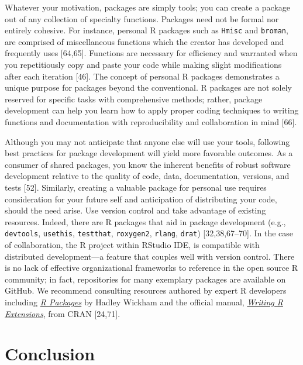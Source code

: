 \documentclass[10pt,letterpaper]{article}
\begin{document}
Whatever your motivation, packages are simply tools; you can create a
package out of any collection of specialty functions. Packages need not
be formal nor entirely cohesive. For instance, personal R packages such
as \texttt{Hmisc} and \texttt{broman}, are comprised of miscellaneous
functions which the creator has developed and frequently uses
{[}64,65{]}. Functions are necessary for efficiency and warranted when
you repetitiously copy and paste your code while making slight
modifications after each iteration {[}46{]}. The concept of personal R
packages demonstrates a unique purpose for packages beyond the
conventional. R packages are not solely reserved for specific tasks with
comprehensive methods; rather, package development can help you learn
how to apply proper coding techniques to writing functions and
documentation with reproducibility and collaboration in mind {[}66{]}.

Although you may not anticipate that anyone else will use your tools,
following best practices for package development will yield more
favorable outcomes. As a consumer of shared packages, you know the
inherent benefits of robust software development relative to the quality
of code, data, documentation, versions, and tests {[}52{]}. Similarly,
creating a valuable package for personal use requires consideration for
your future self and anticipation of distributing your code, should the
need arise. Use version control and take advantage of existing
resources. Indeed, there are R packages that aid in package development
(e.g., \texttt{devtools}, \texttt{usethis}, \texttt{testthat},
\texttt{roxygen2}, \texttt{rlang}, \texttt{drat}) {[}32,38,67--70{]}. In
the case of collaboration, the R project within RStudio IDE, is
compatible with distributed development---a feature that couples well
with version control. There is no lack of effective organizational
frameworks to reference in the open source R community; in fact,
repositories for many exemplary packages are available on GitHub. We
recommend consulting resources authored by expert R developers including
\href{https://r-pkgs.org/}{\emph{R Packages}} by Hadley Wickham and the
official manual,
\href{https://cran.r-project.org/doc/manuals/r-release/R-exts.html}{\emph{Writing
R Extensions}}, from CRAN {[}24,71{]}.

\hypertarget{conclusion}{%
\section{Conclusion}\label{conclusion}}
\end{document}
